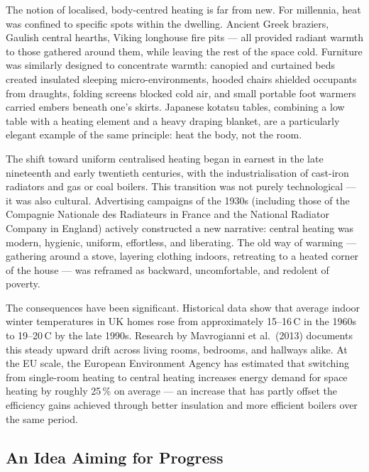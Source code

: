 The notion of localised, body-centred heating is far from new.
For millennia, heat was confined to specific spots within the
dwelling. Ancient Greek braziers, Gaulish central hearths, Viking
longhouse fire pits --- all provided radiant warmth to those
gathered around them, while leaving the rest of the space cold.
Furniture was similarly designed to concentrate warmth: canopied
and curtained beds created insulated sleeping micro-environments,
hooded chairs shielded occupants from draughts, folding screens
blocked cold air, and small portable foot warmers carried embers
beneath one's skirts. Japanese kotatsu tables, combining a low
table with a heating element and a heavy draping blanket, are a
particularly elegant example of the same principle: heat the body,
not the room.

The shift toward uniform centralised heating began in earnest in
the late nineteenth and early twentieth centuries, with the
industrialisation of cast-iron radiators and gas or coal boilers.
This transition was not purely technological --- it was also
cultural. Advertising campaigns of the 1930s (including those of
the Compagnie Nationale des Radiateurs in France and the National
Radiator Company in England) actively constructed a new narrative:
central heating was modern, hygienic, uniform, effortless, and
liberating. The old way of warming --- gathering around a stove,
layering clothing indoors, retreating to a heated corner of the
house --- was reframed as backward, uncomfortable, and redolent
of poverty.

The consequences have been significant. Historical data show that
average indoor winter temperatures in UK homes rose from
approximately 15--16\,\textdegree C in the 1960s to
19--20\,\textdegree C by the late 1990s. Research by Mavrogianni
et al.\ (2013) documents this steady upward drift across living
rooms, bedrooms, and hallways alike. At the EU scale, the European
Environment Agency has estimated that switching from single-room
heating to central heating increases energy demand for space
heating by roughly 25\,\% on average --- an increase that has
partly offset the efficiency gains achieved through better
insulation and more efficient boilers over the same period.

\subsection{An Idea Aiming for Progress}


